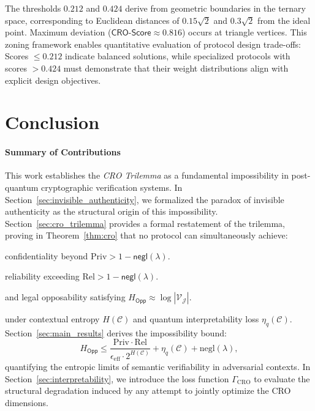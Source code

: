 \documentclass[preprint,12pt]{elsarticle}
\newcommand{\negl}{\mathrm{negl}}
\begin{document}
            \noindent The thresholds $0.212$ and $0.424$ derive from geometric boundaries in the ternary space, corresponding to Euclidean distances of $0.15\sqrt{2}$ and $0.3\sqrt{2}$ from the ideal point. Maximum deviation ($\mathsf{CRO\text{-}Score} \approx 0.816$) occurs at triangle vertices. This zoning framework enables quantitative evaluation of protocol design trade-offs: Scores $\leq 0.212$ indicate balanced solutions, while specialized protocols with scores $> 0.424$ must demonstrate that their weight distributions align with explicit design objectives.

    \section{Conclusion}\label{sec:conclusion}

        \paragraph{Summary of Contributions}
            This work establishes the \emph{CRO Trilemma} as a fundamental impossibility in post-quantum cryptographic verification systems. In Section~\ref{sec:invisible_authenticity}, we formalized the paradox of invisible authenticity as the structural origin of this impossibility. Section~\ref{sec:cro_trilemma} provides a formal restatement of the trilemma, proving in Theorem~\ref{thm:cro} that no protocol can simultaneously achieve:
            \begin{inparaenum}
                \item confidentiality beyond $\mathrm{Priv} > 1 - \mathsf{negl}(\lambda)$.
                \item reliability exceeding $\mathrm{Rel} > 1 - \mathsf{negl}(\lambda)$.
                \item and legal opposability satisfying $H_{\mathsf{Opp}} \approx \log |\mathcal{V_J}|$.
            \end{inparaenum}
            under contextual entropy $H(\mathcal{C})$ and quantum interpretability loss $\eta_q(\mathcal{C})$. Section~\ref{sec:main_results} derives the impossibility bound:
            \[
            H_{\mathsf{Opp}} \leq \frac{\mathrm{Priv} \cdot \mathrm{Rel}}{\epsilon_{\text{eff}} \cdot 2^{H(\mathcal{C})}} + \eta_q(\mathcal{C}) + \negl(\lambda),
            \]
            quantifying the entropic limits of semantic verifiability in adversarial contexts. In Section~\ref{sec:interpretability}, we introduce the loss function $\Gamma_{\text{CRO}}$ to evaluate the structural degradation induced by any attempt to jointly optimize the CRO dimensions.
\end{document}
